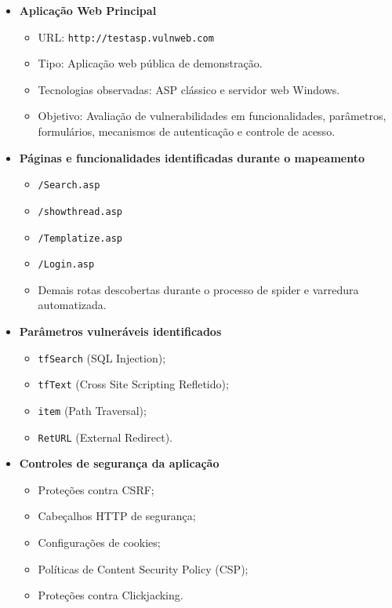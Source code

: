 \begin{itemize}
\item \textbf{Aplicação Web Principal}
\begin{itemize}
\item URL: \texttt{http://testasp.vulnweb.com}
\item Tipo: Aplicação web pública de demonstração.
\item Tecnologias observadas: ASP clássico e servidor web Windows.
\item Objetivo: Avaliação de vulnerabilidades em funcionalidades, parâmetros,
  formulários, mecanismos de autenticação e controle de acesso.
\end{itemize}

\item \textbf{Páginas e funcionalidades identificadas durante o mapeamento}
\begin{itemize}
    \item \texttt{/Search.asp}
    \item \texttt{/showthread.asp}
    \item \texttt{/Templatize.asp}
    \item \texttt{/Login.asp}
    \item Demais rotas descobertas durante o processo de spider e varredura
      automatizada.
\end{itemize}

\item \textbf{Parâmetros vulneráveis identificados}
\begin{itemize}
    \item \texttt{tfSearch} (SQL Injection);
    \item \texttt{tfText} (Cross Site Scripting Refletido);
    \item \texttt{item} (Path Traversal);
    \item \texttt{RetURL} (External Redirect).
\end{itemize}

\item \textbf{Controles de segurança da aplicação}
\begin{itemize}
    \item Proteções contra CSRF;
    \item Cabeçalhos HTTP de segurança;
    \item Configurações de cookies;
    \item Políticas de Content Security Policy (CSP);
    \item Proteções contra Clickjacking.
\end{itemize}

\end{itemize}

